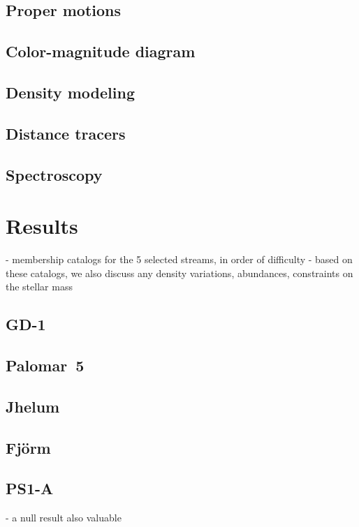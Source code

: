 \documentclass[twocolumn]{aastex63}
\begin{document}
\subsection{Proper motions}

\subsection{Color-magnitude diagram}

\subsection{Density modeling}

\subsection{Distance tracers}

\subsection{Spectroscopy}


\section{Results}
- membership catalogs for the 5 selected streams, in order of difficulty
- based on these catalogs, we also discuss any density variations, abundances, constraints on the stellar mass

\subsection{GD-1}


\subsection{Palomar~5}


\subsection{Jhelum}


\subsection{Fj\" orm}


\subsection{PS1-A}
- a null result also valuable
\end{document}
